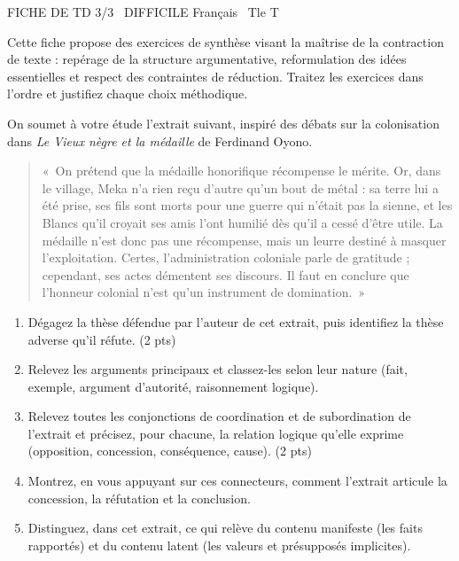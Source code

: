 \documentclass[11pt]{article}
\begin{document}
\begin{tcolorbox}[enhanced,colback=popink,colframe=popink,arc=10pt,boxrule=0pt,left=12pt,right=12pt,top=9pt,bottom=9pt]
{\color{white}\popxbold\small FICHE DE TD 3/3 \textbullet\ DIFFICILE \hfill Français \textbullet\ Tle T\par}
\end{tcolorbox}
\vspace{4pt}
Cette fiche propose des exercices de synthèse visant la maîtrise de la contraction de texte : repérage de la structure argumentative, reformulation des idées essentielles et respect des contraintes de réduction. Traitez les exercices dans l'ordre et justifiez chaque choix méthodique.

\begin{exercice}
On soumet à votre étude l'extrait suivant, inspiré des débats sur la colonisation dans \textit{Le Vieux nègre et la médaille} de Ferdinand Oyono.

\begin{quote}
«~On prétend que la médaille honorifique récompense le mérite. Or, dans le village, Meka n'a rien reçu d'autre qu'un bout de métal : sa terre lui a été prise, ses fils sont morts pour une guerre qui n'était pas la sienne, et les Blancs qu'il croyait ses amis l'ont humilié dès qu'il a cessé d'être utile. La médaille n'est donc pas une récompense, mais un leurre destiné à masquer l'exploitation. Certes, l'administration coloniale parle de gratitude ; cependant, ses actes démentent ses discours. Il faut en conclure que l'honneur colonial n'est qu'un instrument de domination.~»
\end{quote}

\begin{enumerate}
\item Dégagez la thèse défendue par l'auteur de cet extrait, puis identifiez la thèse adverse qu'il réfute. (2 pts)
\item Relevez les arguments principaux et classez-les selon leur nature (fait, exemple, argument d'autorité, raisonnement logique).
\item Relevez toutes les conjonctions de coordination et de subordination de l'extrait et précisez, pour chacune, la relation logique qu'elle exprime (opposition, concession, conséquence, cause). (2 pts)
\item Montrez, en vous appuyant sur ces connecteurs, comment l'extrait articule la concession, la réfutation et la conclusion.
\item Distinguez, dans cet extrait, ce qui relève du contenu manifeste (les faits rapportés) et du contenu latent (les valeurs et présupposés implicites).
\end{enumerate}
\end{exercice}
\end{document}
